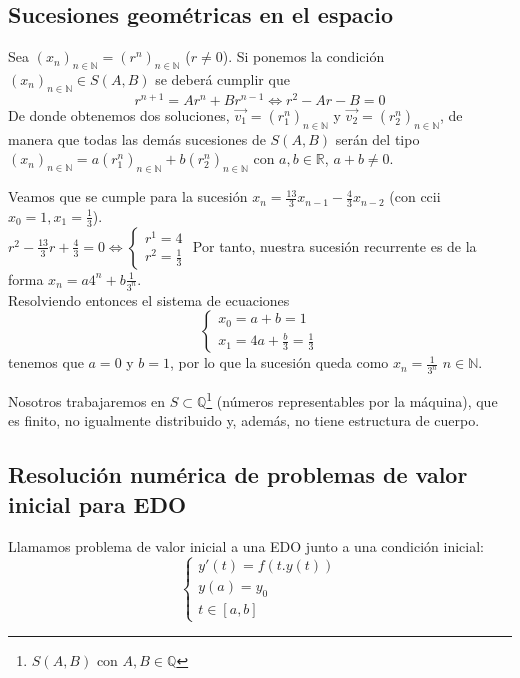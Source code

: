 \subsection{Sucesiones geométricas en el espacio}
Sea $(x_n)_{n\in\mathbb{N}} = (r^n)_{n\in\mathbb{N}}$ ($r \ne 0$). Si ponemos la condición $(x_n)_{n\in\mathbb{N}} \in S(A,B)$ se deberá cumplir que
$$
r^{n+1} = Ar^n + Br^{n-1} \iff r^2-Ar-B=0
$$
De donde obtenemos dos soluciones, $\overrightarrow{v_1} = (r^n_1)_{n\in\mathbb{N}}$ y $\overrightarrow{v_2} = (r^n_2)_{n\in\mathbb{N}}$, de manera que todas las demás sucesiones de $S(A,B)$ serán del tipo $(x_n)_{n\in\mathbb{N}} = a(r^n_1)_{n\in\mathbb{N}} + b(r^n_2)_{n\in\mathbb{N}}$ con $a,b\in \mathbb{R}$, $a+b\ne 0$.
\begin{example}
Veamos que se cumple para la sucesión $x_n = \frac{13}{3}x_{n-1} - \frac{4}{3}x_{n-2}$ (con ccii $x_0 = 1, x_1 = \frac{1}{3}$).\\
$r^2-\frac{13}{3}r+\frac{4}{3} = 0 \iff 
\left\{\begin{matrix}
r^1 = 4 \\
r^2 = \frac{1}{3}
\end{matrix}\right.$
Por tanto, nuestra sucesión recurrente es de la forma $x_n = a4^n + b\frac{1}{3^n}$.\\

Resolviendo entonces el sistema de ecuaciones 
$$\left\{\begin{matrix}
x_0 = a+b = 1 \\
x_1 = 4a + \frac{b}{3} = \frac{1}{3}
\end{matrix}\right.$$
tenemos que $a=0$ y $b=1$, por lo que la sucesión queda como $x_n = \frac{1}{3^n}$ $n\in\mathbb{N}$.
\end{example}
Nosotros trabajaremos en $S\subset \mathbb{Q}$\footnote{$S(A,B)$ con $A,B\in \mathbb{Q}$} (números representables por la máquina), que es finito, no igualmente distribuido y, además, no tiene estructura de cuerpo.



\subsection{Resolución numérica de problemas de valor inicial para EDO}

\begin{definition}
    Llamamos problema de valor inicial a una EDO junto a una condición inicial:
\begin{equation} \label{eqn:pvi}
\begin{cases}
    y'(t)=f(t.y(t)) \\
    y(a) = y_0 \\
    t\in[a,b]
\end{cases}
\end{equation}
\end{definition}

